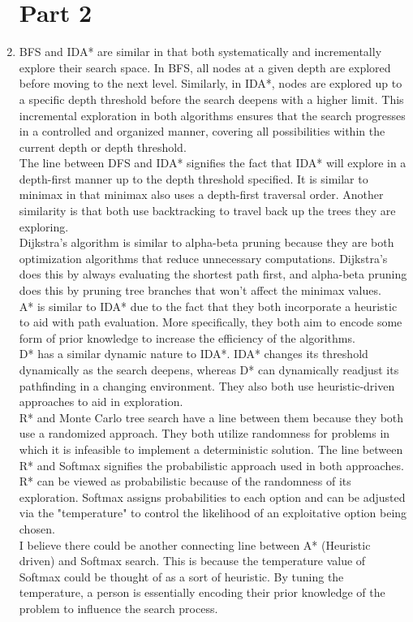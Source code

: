 \documentclass{article}
\begin{document}
\begin{enumerate}
    \section*{Part 2}
    \item BFS and IDA* are similar in that both systematically and incrementally
    explore their search space. In BFS, all nodes at a given depth are explored
    before moving to the next level. Similarly, in IDA*, nodes are explored up to
    a specific depth threshold before the search deepens with a higher limit. This
    incremental exploration in both algorithms ensures that the search progresses
    in a controlled and organized manner, covering all possibilities within the
    current depth or depth threshold. \\
    The line between DFS and IDA* signifies the fact that IDA* will explore in a
    depth-first manner up to the depth threshold specified. It is similar to minimax
    in that minimax also uses a depth-first traversal order. Another similarity is
    that both use backtracking to travel back up the trees they are exploring. \\
    Dijkstra's algorithm is similar to alpha-beta pruning because they are both
    optimization algorithms that reduce unnecessary computations. Dijkstra's does
    this by always evaluating the shortest path first, and alpha-beta pruning does
    this by pruning tree branches that won't affect the minimax values. \\
    A* is similar to IDA* due to the fact that they both incorporate a heuristic
    to aid with path evaluation. More specifically, they both aim to encode some
    form of prior knowledge to increase the efficiency of the algorithms. \\
    D* has a similar dynamic nature to IDA*. IDA* changes its threshold dynamically
    as the search deepens, whereas D* can dynamically readjust its pathfinding
    in a changing environment. They also both use heuristic-driven approaches to aid
    in exploration. \\
    R* and Monte Carlo tree search have a line between them because they both use
    a randomized approach. They both utilize randomness for problems in which it is
    infeasible to implement a deterministic solution. The line between R* and
    Softmax signifies the probabilistic approach used in both approaches. R*
    can be viewed as probabilistic because of the randomness of its exploration.
    Softmax assigns probabilities to each option and can be adjusted via the
    "temperature" to control the likelihood of an exploitative option being
    chosen. \\
    I believe there could be another connecting line between A* (Heuristic driven)
    and Softmax search. This is because the temperature value of Softmax could be
    thought of as a sort of heuristic. By tuning the temperature, a person is
    essentially encoding their prior knowledge of the problem to influence the
    search process.
\end{enumerate}
\end{document}
